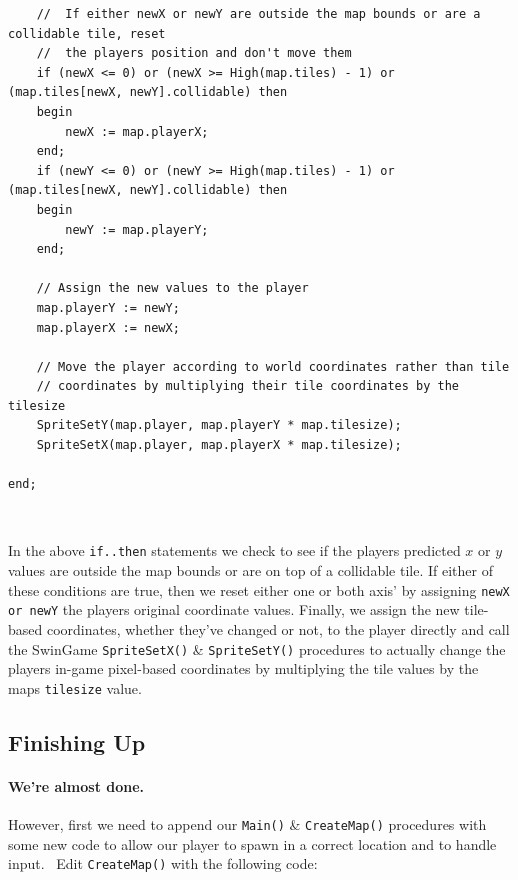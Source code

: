 \documentclass{article}
\begin{document}
 \begin{mdframed}[backgroundcolor=darkgray]
 \begin{verbatim}
	//	If either newX or newY are outside the map bounds or are a collidable tile, reset
	//	the players position and don't move them
	if (newX <= 0) or (newX >= High(map.tiles) - 1) or (map.tiles[newX, newY].collidable) then
	begin
		newX := map.playerX;
	end;
	if (newY <= 0) or (newY >= High(map.tiles) - 1) or (map.tiles[newX, newY].collidable) then
	begin
		newY := map.playerY;
	end;

	// Assign the new values to the player
	map.playerY := newY;
	map.playerX := newX;

	// Move the player according to world coordinates rather than tile
	// coordinates by multiplying their tile coordinates by the tilesize
	SpriteSetY(map.player, map.playerY * map.tilesize);
	SpriteSetX(map.player, map.playerX * map.tilesize);

end;
 \end{verbatim}
 \end{mdframed}

\

In the above \texttt{if..then} statements we check to see if the players predicted $x$ or $y$ values are outside the map bounds or are on top of a collidable tile. If either of these conditions are true, then we reset either one or both axis' by assigning \texttt{newX or newY} the players original coordinate values. Finally, we assign the new tile-based coordinates, whether they've changed or not, to the player directly and call the SwinGame \texttt{SpriteSetX()} \& \texttt{SpriteSetY()} procedures to actually change the players in-game pixel-based coordinates by multiplying the tile values by the maps \texttt{tilesize} value.

\subsection{Finishing Up}

\paragraph{We're almost done.} However, first we need to append our \texttt{Main()} \& \texttt{CreateMap()} procedures with some new code to allow our player to spawn in a correct location and to handle input.
\
Edit \texttt{CreateMap()} with the following code:
\
\vspace{0.5cm}
\end{document}
